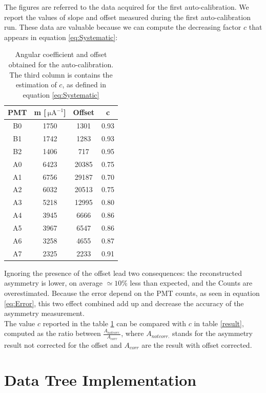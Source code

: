 The figures are referred to the data acquired for the first auto-calibration. We report the values of slope and offset measured during the first auto-calibration run. These data are valuable because we can compute the decreasing factor $c$ that appears in equation \ref{eq:Systematic}:
\begin{table}[h]
\centering
\begin{tabular}{c|c|c|c}
\hline
 PMT & m [$\SI{}{\micro \ampere}^{-1}$] & Offset & c  \\
\hline
 B0  & 1750 &  1301 &  0.93 \\
 B1  & 1742 &  1283 &  0.93 \\
 B2  & 1406 &   717 &  0.95 \\
 A0  & 6423 & 20385 &  0.75 \\
 A1  & 6756 & 29187 &  0.70 \\
 A2  & 6032 & 20513 &  0.75 \\
 A3  & 5218 & 12995 &  0.80 \\
 A4  & 3945 &  6666 &  0.86 \\
 A5  & 3967 &  6547 &  0.86 \\
 A6  & 3258 &  4655 &  0.87 \\
 A7  & 2325 &  2233 &  0.91 \\
\hline
\end{tabular}
\caption{Angular coefficient and offset obtained for the auto-calibration. The third column is contains the estimation of $c$, as defined in equation \ref{eq:Systematic}}
\label{table:PMToffset}
\end{table}
Ignoring the presence of the offset lead two consequences: the reconstructed asymmetry is lower, on average $ \simeq 10\%$ less than expected, and the Counts are overestimated. Because the error depend on the PMT counts, as seen in equation \ref{eq:Error}, this two effect combined add up and decrease the accuracy of the asymmetry measurement.\\
The value $c$ reported in the table \ref{table:PMToffset} can be compared with $c$ in table \ref{result}, computed as the ratio between $\frac{A_{not corr.}}{A_{corr}}$, where $A_{not corr.}$ stands for the asymmetry result not corrected for the offset and $A_{corr}$ are the result with offset corrected. 

\section{Data Tree Implementation}


